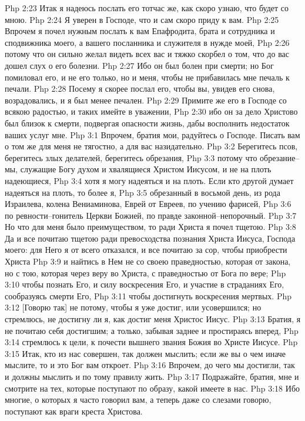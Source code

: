 Php 2:23  Итак я надеюсь послать его тотчас же, как скоро узнаю, что будет со мною.
Php 2:24  Я уверен в Господе, что и сам скоро приду к вам.
Php 2:25  Впрочем я почел нужным послать к вам Епафродита, брата и сотрудника и сподвижника моего, а вашего посланника и служителя в нужде моей,
Php 2:26  потому что он сильно желал видеть всех вас и тяжко скорбел о том, что до вас дошел слух о его болезни.
Php 2:27  Ибо он был болен при смерти; но Бог помиловал его, и не его только, но и меня, чтобы не прибавилась мне печаль к печали.
Php 2:28  Посему я скорее послал его, чтобы вы, увидев его снова, возрадовались, и я был менее печален.
Php 2:29  Примите же его в Господе со всякою радостью, и таких имейте в уважении,
Php 2:30  ибо он за дело Христово был близок к смерти, подвергая опасности жизнь, дабы восполнить недостаток ваших услуг мне.
Php 3:1  Впрочем, братия мои, радуйтесь о Господе. Писать вам о том же для меня не тягостно, а для вас назидательно.
Php 3:2  Берегитесь псов, берегитесь злых делателей, берегитесь обрезания,
Php 3:3  потому что обрезание--мы, служащие Богу духом и хвалящиеся Христом Иисусом, и не на плоть надеющиеся,
Php 3:4  хотя я могу надеяться и на плоть. Если кто другой думает надеяться на плоть, то более я,
Php 3:5  обрезанный в восьмой день, из рода Израилева, колена Вениаминова, Еврей от Евреев, по учению фарисей,
Php 3:6  по ревности--гонитель Церкви Божией, по правде законной--непорочный.
Php 3:7  Но что для меня было преимуществом, то ради Христа я почел тщетою.
Php 3:8  Да и все почитаю тщетою ради превосходства познания Христа Иисуса, Господа моего: для Него я от всего отказался, и все почитаю за сор, чтобы приобрести Христа
Php 3:9  и найтись в Нем не со своею праведностью, которая от закона, но с тою, которая через веру во Христа, с праведностью от Бога по вере;
Php 3:10  чтобы познать Его, и силу воскресения Его, и участие в страданиях Его, сообразуясь смерти Его,
Php 3:11  чтобы достигнуть воскресения мертвых.
Php 3:12  [Говорю так] не потому, чтобы я уже достиг, или усовершился; но стремлюсь, не достигну ли я, как достиг меня Христос Иисус.
Php 3:13  Братия, я не почитаю себя достигшим; а только, забывая заднее и простираясь вперед,
Php 3:14  стремлюсь к цели, к почести вышнего звания Божия во Христе Иисусе.
Php 3:15  Итак, кто из нас совершен, так должен мыслить; если же вы о чем иначе мыслите, то и это Бог вам откроет.
Php 3:16  Впрочем, до чего мы достигли, так и должны мыслить и по тому правилу жить.
Php 3:17  Подражайте, братия, мне и смотрите на тех, которые поступают по образу, какой имеете в нас.
Php 3:18  Ибо многие, о которых я часто говорил вам, а теперь даже со слезами говорю, поступают как враги креста Христова.
